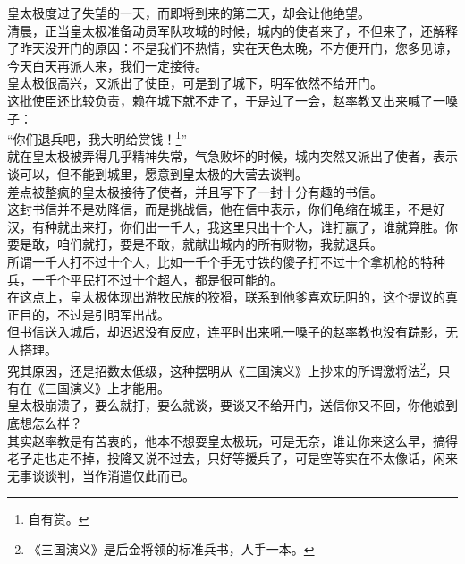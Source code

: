 \begin{multicols}{\theparacolNo}
皇太极度过了失望的一天，而即将到来的第二天，却会让他绝望。\\

清晨，正当皇太极准备动员军队攻城的时候，城内的使者来了，不但来了，还解释了昨天没开门的原因：不是我们不热情，实在天色太晚，不方便开门，您多见谅，今天白天再派人来，我们一定接待。\\

皇太极很高兴，又派出了使臣，可是到了城下，明军依然不给开门。\\

这批使臣还比较负责，赖在城下就不走了，于是过了一会，赵率教又出来喊了一嗓子：\\

“你们退兵吧，我大明给赏钱！\footnote{自有赏。}”\\

就在皇太极被弄得几乎精神失常，气急败坏的时候，城内突然又派出了使者，表示谈可以，但不能到城里，愿意到皇太极的大营去谈判。\\

差点被整疯的皇太极接待了使者，并且写下了一封十分有趣的书信。\\

这封书信并不是劝降信，而是挑战信，他在信中表示，你们龟缩在城里，不是好汉，有种就出来打，你们出一千人，我这里只出十个人，谁打赢了，谁就算胜。你要是敢，咱们就打，要是不敢，就献出城内的所有财物，我就退兵。\\

所谓一千人打不过十个人，比如一千个手无寸铁的傻子打不过十个拿机枪的特种兵，一千个平民打不过十个超人，都是很可能的。\\

在这点上，皇太极体现出游牧民族的狡猾，联系到他爹喜欢玩阴的，这个提议的真正目的，不过是引明军出战。\\

但书信送入城后，却迟迟没有反应，连平时出来吼一嗓子的赵率教也没有踪影，无人搭理。\\

究其原因，还是招数太低级，这种摆明从《三国演义》上抄来的所谓激将法\footnote{《三国演义》是后金将领的标准兵书，人手一本。}，只有在《三国演义》上才能用。\\

皇太极崩溃了，要么就打，要么就谈，要谈又不给开门，送信你又不回，你他娘到底想怎么样？\\

其实赵率教是有苦衷的，他本不想耍皇太极玩，可是无奈，谁让你来这么早，搞得老子走也走不掉，投降又说不过去，只好等援兵了，可是空等实在不太像话，闲来无事谈谈判，当作消遣仅此而已。\\


\end{multicols}

